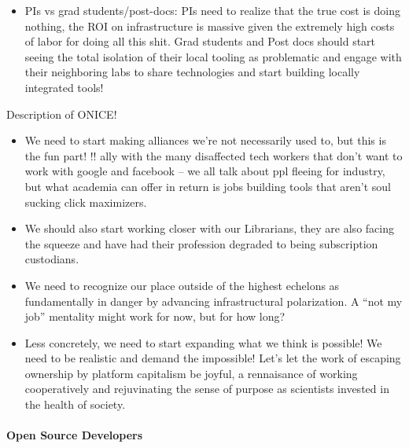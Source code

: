 \documentclass[10pt]{article}
\begin{document}
\begin{multicols}{2}
\begin{itemize}

\item
  PIs vs grad students/post-docs: PIs need to realize that the true cost
  is doing nothing, the ROI on infrastructure is massive given the
  extremely high costs of labor for doing all this shit. Grad students
  and Post docs should start seeing the total isolation of their local
  tooling as problematic and engage with their neighboring labs to share
  technologies and start building locally integrated tools!
\end{itemize}

Description of ONICE!

\begin{itemize}

\item
  We need to start making alliances we're not necessarily used to, but
  this is the fun part! !! ally with the many disaffected tech workers
  that don't want to work with google and facebook -- we all talk about
  ppl fleeing for industry, but what academia can offer in return is
  jobs building tools that aren't soul sucking click maximizers.
\item
  We should also start working closer with our Librarians, they are also
  facing the squeeze and have had their profession degraded to being
  subscription custodians.
\item
  We need to recognize our place outside of the highest echelons as
  fundamentally in danger by advancing infrastructural polarization. A
  ``not my job'' mentality might work for now, but for how long?
\item
  Less concretely, we need to start expanding what we think is possible!
  We need to be realistic and demand the impossible! Let's let the work
  of escaping ownership by platform capitalism be joyful, a rennaisance
  of working cooperatively and rejuvinating the sense of purpose as
  scientists invested in the health of society.
\end{itemize}

\hypertarget{open-source-developers}{%
\paragraph{Open Source Developers}\label{open-source-developers}}

\begin{itemize}


\end{itemize}
\end{multicols}
\end{document}
